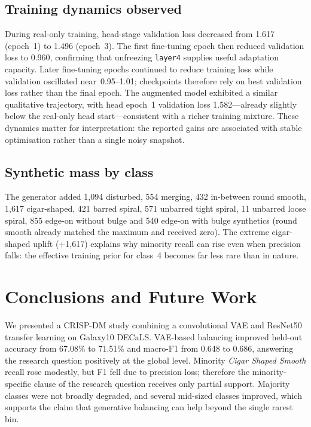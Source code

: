 \documentclass[conference]{IEEEtran}
\begin{document}
\subsection{Training dynamics observed}
During real-only training, head-stage validation loss decreased from 1.617 (epoch~1) to 1.496 (epoch~3). The first fine-tuning epoch then reduced validation loss to 0.960, confirming that unfreezing \texttt{layer4} supplies useful adaptation capacity. Later fine-tuning epochs continued to reduce training loss while validation oscillated near~0.95--1.01; checkpoints therefore rely on best validation loss rather than the final epoch. The augmented model exhibited a similar qualitative trajectory, with head epoch~1 validation loss 1.582---already slightly below the real-only head start---consistent with a richer training mixture. These dynamics matter for interpretation: the reported gains are associated with stable optimisation rather than a single noisy snapshot.

\subsection{Synthetic mass by class}
The generator added 1{,}094 disturbed, 554 merging, 432 in-between round smooth, 1{,}617 cigar-shaped, 421 barred spiral, 571 unbarred tight spiral, 11 unbarred loose spiral, 855 edge-on without bulge and 540 edge-on with bulge synthetics (round smooth already matched the maximum and received zero). The extreme cigar-shaped uplift (+1{,}617) explains why minority recall can rise even when precision falls: the effective training prior for class~4 becomes far less rare than in nature.

\section{Conclusions and Future Work}
\label{sec:conclusion}
We presented a CRISP-DM study combining a convolutional VAE and ResNet50 transfer learning on Galaxy10 DECaLS. VAE-based balancing improved held-out accuracy from 67.08\% to 71.51\% and macro-F1 from 0.648 to 0.686, answering the research question positively at the global level. Minority \emph{Cigar Shaped Smooth} recall rose modestly, but F1 fell due to precision loss; therefore the minority-specific clause of the research question receives only partial support. Majority classes were not broadly degraded, and several mid-sized classes improved, which supports the claim that generative balancing can help beyond the single rarest bin.
\end{document}
